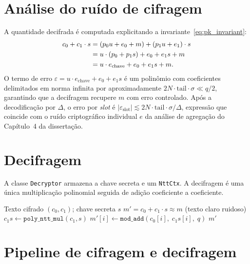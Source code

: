 \documentclass[11pt,a4paper]{report}
\begin{document}
\section{Análise do ruído de cifragem}
\label{sec:encrypt_noise}

A quantidade decifrada é computada explicitando a invariante~\eqref{eq:pk_invariant}:
\begin{align}
  c_0 + c_1 \cdot s
    &= (p_0 u + e_0 + m) + (p_1 u + e_1) \cdot s \notag \\
    &= u \cdot (p_0 + p_1 s) + e_0 + e_1 s + m \notag \\
    &= u \cdot e_{\text{chave}} + e_0 + e_1 s + m.
    \label{eq:enc_noise}
\end{align}
O termo de erro $\varepsilon = u \cdot e_{\text{chave}} + e_0 + e_1 s$ é um polinômio
com coeficientes delimitados em norma infinita por aproximadamente
$2N \cdot \text{tail} \cdot \sigma \ll q/2$, garantindo que a decifragem recupere $m$
com erro controlado. Após a decodificação por $\Delta$, o erro por \emph{slot} é
$|\varepsilon_{\text{slot}}| \lesssim 2N \cdot \text{tail} \cdot \sigma / \Delta$,
expressão que coincide com o ruído criptográfico individual $e$ da análise de agregação
do Capítulo~4 da dissertação.

\section{Decifragem}
\label{sec:decrypt}

A classe \texttt{Decryptor} armazena a chave secreta e um \texttt{NttCtx}. A decifragem
é uma única multiplicação polinomial seguida de adição coeficiente a coeficiente.

\begin{algorithm}[ht]
\caption{\texttt{decrypt}: decifragem de texto cifrado CKKS}
\label{alg:decrypt}
\begin{algorithmic}[1]
\Require Texto cifrado $(c_0, c_1)$;\; chave secreta $s$
\Ensure $m' = c_0 + c_1 \cdot s \approx m$ (texto claro ruidoso)
\State $c_1 s \gets \texttt{poly\_ntt\_mul}(c_1, s)$
  \State $m'[i] \gets \texttt{mod\_add}(c_0[i],\; c_1 s[i],\; q)$
\EndFor
\State \Return $m'$
\end{algorithmic}
\end{algorithm}

\section{Pipeline de cifragem e decifragem}
\label{sec:pipeline}
\end{document}
